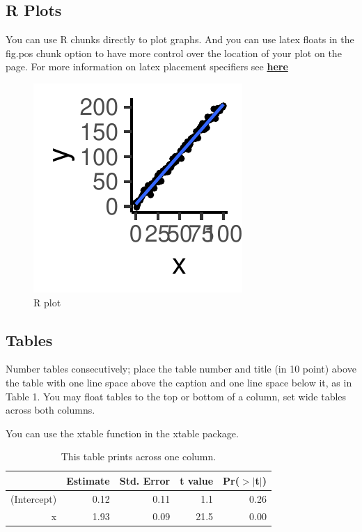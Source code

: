\documentclass[10pt, letterpaper]{article}
\newenvironment{CodeChunk}{}{}
\begin{document}
\subsection{R Plots}\label{r-plots}

You can use R chunks directly to plot graphs. And you can use latex
floats in the fig.pos chunk option to have more control over the
location of your plot on the page. For more information on latex
placement specifiers see
\textbf{\href{https://en.wikibooks.org/wiki/LaTeX/Floats,_Figures_and_Captions}{here}}

\begin{CodeChunk}
\begin{figure}[H]

{\centering \includegraphics{figs/plot-1} 

}

\caption[R plot]{R plot}\label{fig:plot}
\end{figure}
\end{CodeChunk}

\subsection{Tables}\label{tables}

Number tables consecutively; place the table number and title (in 10
point) above the table with one line space above the caption and one
line space below it, as in Table 1. You may float tables to the top or
bottom of a column, set wide tables across both columns.

You can use the xtable function in the xtable package.

\begin{table}[H]
\centering
\begin{tabular}{rrrrr}
  \hline
 & Estimate & Std. Error & t value & Pr($>$$|$t$|$) \\ 
  \hline
(Intercept) & 0.12 & 0.11 & 1.1 & 0.26 \\ 
  x & 1.93 & 0.09 & 21.5 & 0.00 \\ 
   \hline
\end{tabular}
\caption{This table prints across one column.} 
\end{table}
\end{document}
